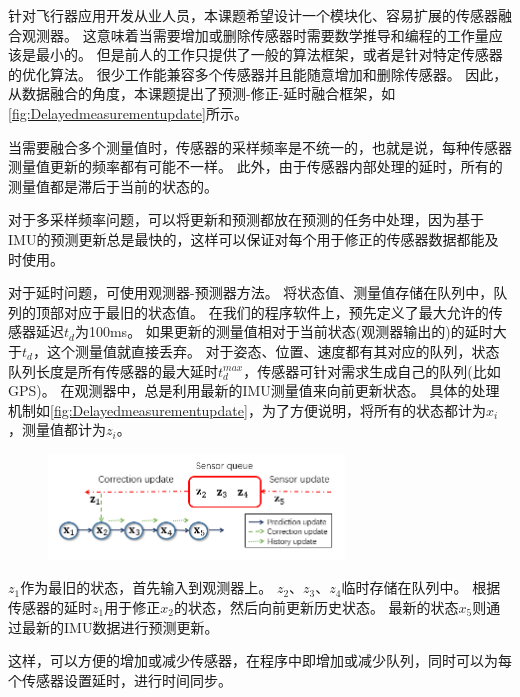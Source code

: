 \documentclass[
  type=master
]{gdutthesis}
\begin{document}
针对飞行器应用开发从业人员，本课题希望设计一个模块化、容易扩展的传感器融合观测器。
这意味着当需要增加或删除传感器时需要数学推导和编程的工作量应该是最小的。
但是前人的工作只提供了一般的算法框架，或者是针对特定传感器的优化算法。
很少工作能兼容多个传感器并且能随意增加和删除传感器。
因此，从数据融合的角度，本课题提出了预测-修正-延时融合框架，如\autoref{fig:Delayedmeasurementupdate}所示。

当需要融合多个测量值时，传感器的采样频率是不统一的，也就是说，每种传感器测量值更新的频率都有可能不一样。
此外，由于传感器内部处理的延时，所有的测量值都是滞后于当前的状态的。

对于多采样频率问题，可以将更新和预测都放在预测的任务中处理，因为基于IMU的预测更新总是最快的，这样可以保证对每个用于修正的传感器数据都能及时使用。

对于延时问题，可使用观测器-预测器方法\cite{khosravian2014velocity}。
将状态值、测量值存储在队列中，队列的顶部对应于最旧的状态值。
在我们的程序软件上，预先定义了最大允许的传感器延迟$t_d$为100ms。
如果更新的测量值相对于当前状态(观测器输出的)的延时大于$t_d$，这个测量值就直接丢弃。
对于姿态、位置、速度都有其对应的队列，状态队列长度是所有传感器的最大延时$t_d^{max}$，传感器可针对需求生成自己的队列(比如GPS)。
在观测器中，总是利用最新的IMU测量值来向前更新状态。
具体的处理机制如\autoref{fig:Delayedmeasurementupdate}，为了方便说明，将所有的状态都计为$x_i$，测量值都计为$z_i$。
\begin{figure}[htbp]
	\centering
	\includegraphics[width=0.7\textwidth]{Delayed and out-of-order measurement update.png}
	\label{fig:Delayedmeasurementupdate}
\end{figure} 

$z_1$作为最旧的状态，首先输入到观测器上。
$z_2$、$z_3$、$z_4$临时存储在队列中。
根据传感器的延时$z_1$用于修正$x_2$的状态，然后向前更新历史状态。
最新的状态$x_5$则通过最新的IMU数据进行预测更新。

这样，可以方便的增加或减少传感器，在程序中即增加或减少队列，同时可以为每个传感器设置延时，进行时间同步。
\end{document}
